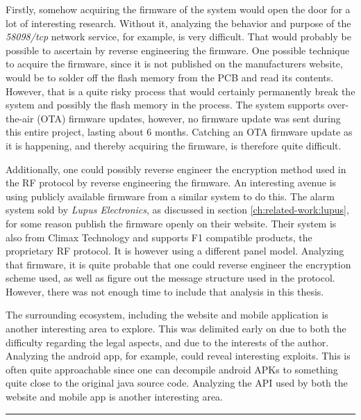 Firstly, somehow acquiring the firmware of the system would open the door for a lot of interesting research. Without it, analyzing the behavior and purpose of the \textit{58098/tcp} network service, for example, is very difficult. That would probably be possible to ascertain by reverse engineering the firmware. One possible technique to acquire the firmware, since it is not published on the manufacturers website, would be to solder off the flash memory from the PCB and read its contents. However, that is a quite risky process that would certainly permanently break the system and possibly the flash memory in the process. The system supports over-the-air (OTA) firmware updates, however, no firmware update was sent during this entire project, lasting about 6 months. Catching an OTA firmware update as it is happening, and thereby acquiring the firmware, is therefore quite difficult.

Additionally, one could possibly reverse engineer the encryption method used in the RF protocol by reverse engineering the firmware. An interesting avenue is using publicly available firmware from a similar system to do this. The alarm system sold by \textit{Lupus Electronics}, as discussed in section \ref{ch:related-work:lupus}, for some reason publish the firmware openly on their website. Their system is also from Climax Technology and supports F1 compatible products, the proprietary RF protocol. It is however using a different panel model. Analyzing that firmware, it is quite probable that one could reverse engineer the encryption scheme used, as well as figure out the message structure used in the protocol. However, there was not enough time to include that analysis in this thesis.

The surrounding ecosystem, including the website and mobile application is another interesting area to explore. This was delimited early on due to both the difficulty regarding the legal aspects, and due to the interests of the author. Analyzing the android app, for example, could reveal interesting exploits. This is often quite approachable since one can decompile android APKs to something quite close to the original java source code. Analyzing the API used by both the website and mobile app is another interesting area.

\noindent\rule{\textwidth}{0.4mm}
